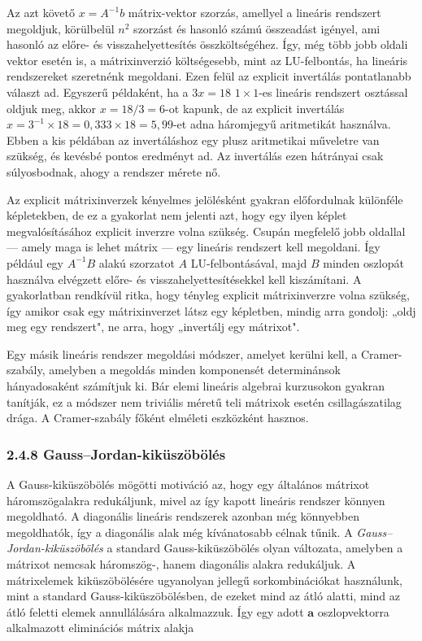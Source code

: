 \documentclass[
  magyar,
  11pt]{article}
\providecommand{\boldsymbol}[1]{\mathbf{#1}}
\begin{document}
Az azt követő \(x = A^{-1}b\) mátrix-vektor szorzás, amellyel a lineáris
rendszert megoldjuk, körülbelül \(n^2\) szorzást és hasonló számú
összeadást igényel, ami hasonló az előre- és visszahelyettesítés
összköltségéhez. Így, még több jobb oldali vektor esetén is, a
mátrixinverzió költségesebb, mint az LU-felbontás, ha lineáris
rendszereket szeretnénk megoldani. Ezen felül az explicit invertálás
pontatlanabb választ ad. Egyszerű példaként, ha a \(3x = 18\)
\(1 \times 1\)-es lineáris rendszert osztással oldjuk meg, akkor
\(x = 18/3 = 6\)-ot kapunk, de az explicit invertálás
\(x = 3^{-1} \times 18 = 0{,}333 \times 18 = 5{,}99\)-et adna háromjegyű
aritmetikát használva. Ebben a kis példában az invertáláshoz egy plusz
aritmetikai műveletre van szükség, és kevésbé pontos eredményt ad. Az
invertálás ezen hátrányai csak súlyosbodnak, ahogy a rendszer mérete nő.

Az explicit mátrixinverzek kényelmes jelölésként gyakran előfordulnak
különféle képletekben, de ez a gyakorlat nem jelenti azt, hogy egy ilyen
képlet megvalósításához explicit inverzre volna szükség. Csupán
megfelelő jobb oldallal --- amely maga is lehet mátrix --- egy lineáris
rendszert kell megoldani. Így például egy \(A^{-1}B\) alakú szorzatot
\(A\) LU-felbontásával, majd \(B\) minden oszlopát használva elvégzett
előre- és visszahelyettesítésekkel kell kiszámítani. A gyakorlatban
rendkívül ritka, hogy tényleg explicit mátrixinverzre volna szükség, így
amikor csak egy mátrixinverzet látsz egy képletben, mindig arra gondolj:
„oldj meg egy rendszert", ne arra, hogy „invertálj egy mátrixot".

Egy másik lineáris rendszer megoldási módszer, amelyet kerülni kell, a
Cramer-szabály, amelyben a megoldás minden komponensét determinánsok
hányadosaként számítjuk ki. Bár elemi lineáris algebrai kurzusokon
gyakran tanítják, ez a módszer nem triviális méretű teli mátrixok esetén
csillagászatilag drága. A Cramer-szabály főként elméleti eszközként
hasznos.

\subsubsection{2.4.8
Gauss--Jordan-kiküszöbölés}\label{gaussjordan-kikuxfcszuxf6buxf6luxe9s}

A Gauss-kiküszöbölés mögötti motiváció az, hogy egy általános mátrixot
háromszögalakra redukáljunk, mivel az így kapott lineáris rendszer
könnyen megoldható. A diagonális lineáris rendszerek azonban még
könnyebben megoldhatók, így a diagonális alak még kívánatosabb célnak
tűnik. A \emph{Gauss--Jordan-kiküszöbölés} a standard Gauss-kiküszöbölés
olyan változata, amelyben a mátrixot nemcsak háromszög-, hanem
diagonális alakra redukáljuk. A mátrixelemek kiküszöbölésére ugyanolyan
jellegű sorkombinációkat használunk, mint a standard
Gauss-kiküszöbölésben, de ezeket mind az átló alatti, mind az átló
feletti elemek annullálására alkalmazzuk. Így egy adott
\(\boldsymbol{a}\) oszlopvektorra alkalmazott eliminációs mátrix alakja
\end{document}
